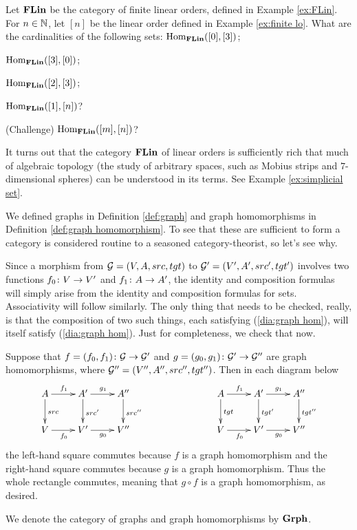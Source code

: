 \begin{exercise}
Let ${\bf FLin}$ be the category of finite linear orders, defined in Example \ref{ex:FLin}. For $n\in{\mathbb N}$, let $[n]$ be the linear order defined in Example \ref{ex:finite lo}. What are the cardinalities of the following sets: 
\sexc $\textnormal{Hom}_{{\bf FLin}}([0],[3])$; 
\item $\textnormal{Hom}_{\bf FLin}([3],[0])$;
\item $\textnormal{Hom}_{\bf FLin}([2],[3])$;
\item $\textnormal{Hom}_{\bf FLin}([1],[n])$?
\item (Challenge) $\textnormal{Hom}_{\bf FLin}([m],[n])$?
\endsexc

It turns out that the category ${\bf FLin}$ of linear orders is sufficiently rich that much of algebraic topology (the study of arbitrary spaces, such as Mobius strips and $7$-dimensional spheres) can be understood in its terms. See Example \ref{ex:simplicial set}.
\end{exercise}

\begin{example}

We defined graphs in Definition \ref{def:graph} and graph homomorphisms in Definition \ref{def:graph homomorphism}. To see that these are sufficient to form a category is considered routine to a seasoned category-theorist, so let's see why. 

Since a morphism from $\mathcal{G}=(V,A,src,tgt)$ to $\mathcal{G}'=(V',A',src',tgt')$ involves two functions $f_0\colon V\rightarrow V'$ and $f_1\colon A\rightarrow A'$, the identity and composition formulas will simply arise from the identity and composition formulas for sets. Associativity will follow similarly. The only thing that needs to be checked, really, is that the composition of two such things, each satisfying (\ref{dia:graph hom}), will itself satisfy (\ref{dia:graph hom}). Just for completeness, we check that now.

Suppose that $f=(f_0,f_1)\colon\mathcal{G}\rightarrow\mathcal{G}'$ and $g=(g_0,g_1)\colon\mathcal{G}'\rightarrow\mathcal{G}''$ are graph homomorphisms, where $\mathcal{G}''=(V'',A'',src'',tgt'')$. Then in each diagram below
\begin{align}\label{dia:graph hom comp}
\xymatrix{A\ar[r]^{f_1}\ar[d]^{src}&A'\ar[r]^{g_1}\ar[d]^{src'}&A''\ar[d]^{src''}\\V\ar[r]_{f_0}&V'\ar[r]_{g_0}&V''
}\hspace{1in}
\xymatrix{A\ar[r]^{f_1}\ar[d]^{tgt}&A'\ar[d]^{tgt'}\ar[r]^{g_1}&A''\ar[d]^{tgt''}\\V\ar[r]_{f_0}&V'\ar[r]_{g_0}&V''
}
\end{align}
the left-hand square commutes because $f$ is a graph homomorphism and the right-hand square commutes because $g$ is a graph homomorphism. Thus the whole rectangle commutes, meaning that $g\circ f$ is a graph homomorphism, as desired. 

We denote the category of graphs and graph homomorphisms by ${\bf Grph}$.

\end{example}

